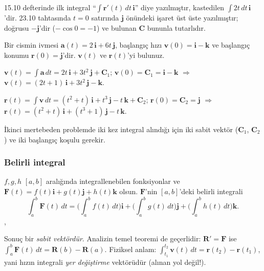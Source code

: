 \begin{bilgi}
15.10 defterinde ilk integral ``$\int\mathbf r'(t)\,dt\,\mathbf i$'' diye yazılmıştır, kastedilen $\int 2t\,dt\,\mathbf i$'dir.
23.10 tahtasında $t=0$ satırında $\mathbf j$ önündeki işaret üst üste yazılmıştır; doğrusu $-\mathbf j$'dir ($-\cos0=-1$) ve bulunan
$\mathbf C$ bununla tutarlıdır.
\end{bilgi}

\begin{soru}
Bir cismin ivmesi $\mathbf a(t)=2\,\mathbf i+6t\,\mathbf j$, başlangıç hızı $\mathbf v(0)=\mathbf i-\mathbf k$ ve başlangıç konumu
$\mathbf r(0)=\mathbf j$'dir. $\mathbf v(t)$ ve $\mathbf r(t)$'yi bulunuz.
\end{soru}
\begin{cevap}
$\mathbf v(t)=\int\mathbf a\,dt=2t\,\mathbf i+3t^2\,\mathbf j+\mathbf C_1$; $\mathbf v(0)=\mathbf C_1=\mathbf i-\mathbf k$ $\Rightarrow$
$\mathbf v(t)=(2t+1)\,\mathbf i+3t^2\,\mathbf j-\mathbf k$.

$\mathbf r(t)=\int\mathbf v\,dt=(t^2+t)\,\mathbf i+t^3\,\mathbf j-t\,\mathbf k+\mathbf C_2$; $\mathbf r(0)=\mathbf C_2=\mathbf j$ $\Rightarrow$
$\mathbf r(t)=(t^2+t)\,\mathbf i+(t^3+1)\,\mathbf j-t\,\mathbf k$.

İkinci mertebeden problemde iki kez integral alındığı için iki sabit vektör ($\mathbf C_1$, $\mathbf C_2$) ve iki başlangıç koşulu gerekir.
\end{cevap}

\subsubsection{Belirli integral}

\begin{tanim}
$f,g,h$ $[a,b]$ aralığında integrallenebilen fonksiyonlar ve $\mathbf F(t)=f(t)\mathbf i+g(t)\mathbf j+h(t)\mathbf k$ olsun.
$\mathbf F$'nin $[a,b]$'deki belirli integrali
\[ \int_a^b\mathbf F(t)\,dt=\Big(\int_a^bf(t)\,dt\Big)\mathbf i+\Big(\int_a^bg(t)\,dt\Big)\mathbf j+\Big(\int_a^bh(t)\,dt\Big)\mathbf k . \]
, 
\end{tanim}

Sonuç bir \emph{sabit vektördür}. Analizin temel teoremi de geçerlidir: $\mathbf R'=\mathbf F$ ise
$\int_a^b\mathbf F(t)\,dt=\mathbf R(b)-\mathbf R(a)$. Fiziksel anlam: $\int_{t_1}^{t_2}\mathbf v(t)\,dt=\mathbf r(t_2)-\mathbf r(t_1)$, yani
hızın integrali \emph{yer değiştirme} vektörüdür (alınan yol değil!).

